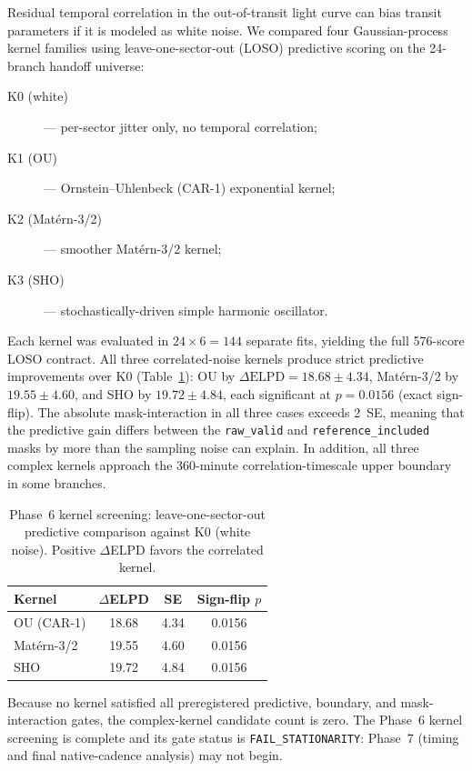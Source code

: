 \documentclass[11pt]{article}
\begin{document}
Residual temporal correlation in the out-of-transit light curve can bias
transit parameters if it is modeled as white noise.  We compared four
Gaussian-process kernel families using leave-one-sector-out (LOSO)
predictive scoring on the 24-branch handoff universe:
%
\begin{description}
  \item[K0 (white)] --- per-sector jitter only, no temporal correlation;
  \item[K1 (OU)] --- Ornstein--Uhlenbeck (CAR-1) exponential kernel;
  \item[K2 (Mat\'ern-3/2)] --- smoother Mat\'ern-3/2 kernel;
  \item[K3 (SHO)] --- stochastically-driven simple harmonic oscillator.
\end{description}
%
Each kernel was evaluated in $24 \times 6 = 144$ separate fits, yielding the
full 576-score LOSO contract.  All three correlated-noise kernels produce
strict predictive improvements over K0 (Table~\ref{tab:kernels}):
OU by $\Delta\mathrm{ELPD} = 18.68 \pm 4.34$,
Mat\'ern-3/2 by $19.55 \pm 4.60$, and
SHO by $19.72 \pm 4.84$, each significant at $p=0.0156$ (exact sign-flip).
The absolute mask-interaction in all three cases exceeds 2~SE, meaning that
the predictive gain differs between the \texttt{raw\_valid} and
\texttt{reference\_included} masks by more than the sampling noise can
explain.  In addition, all three complex kernels approach the
360-minute correlation-timescale upper boundary in some branches.

\begin{table}[ht]
\centering
\caption{Phase~6 kernel screening: leave-one-sector-out predictive comparison
  against K0 (white noise).  Positive $\Delta$ELPD favors the correlated
  kernel.}
\label{tab:kernels}
\begin{tabular}{lccc}
\toprule
Kernel & $\Delta$ELPD & SE & Sign-flip $p$ \\
\midrule
OU (CAR-1)            & 18.68 & 4.34 & 0.0156 \\
Mat\'ern-3/2          & 19.55 & 4.60 & 0.0156 \\
SHO                   & 19.72 & 4.84 & 0.0156 \\
\bottomrule
\end{tabular}
\end{table}

Because no kernel satisfied all preregistered predictive, boundary, and
mask-interaction gates, the complex-kernel candidate count is zero.  The
Phase~6 kernel screening is complete and its gate status is
\texttt{FAIL\_STATIONARITY}: Phase~7 (timing and final native-cadence
analysis) may not begin.
\end{document}
